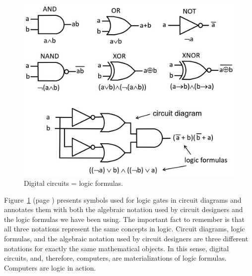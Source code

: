 \begin{figure}
\begin{center}
\includegraphics[scale=1]{images-cmyk/LogicGates}
\end{center}
\caption{Digital circuits = logic formulas.}
\label{fig-02-logic-gates}
\end{figure}

Figure~\ref{fig-02-logic-gates} (page \pageref{fig-02-logic-gates})
presents symbols used for logic gates in circuit diagrams
and annotates them with both
the algebraic notation used by circuit designers
and the logic formulas we have been using.
The important fact to remember is that all three notations
represent the same concepts in logic. Circuit diagrams, logic formulas,
and the algebraic notation used by circuit designers are three
different notations for exactly the same mathematical objects.
In this sense, digital circuits, and, therefore, computers,
are materializations of logic formulas.
Computers are
logic in action.

